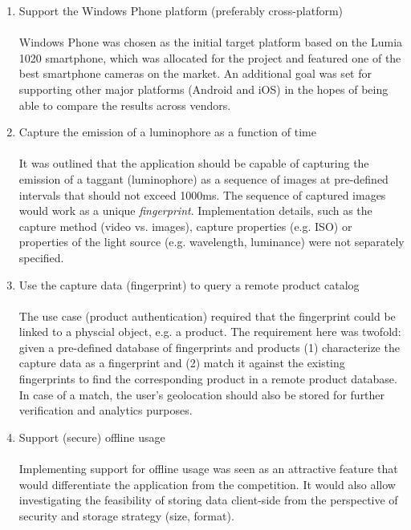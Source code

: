 \documentclass[thesis.tex]{subfiles}
\begin{document}
\begin{enumerate}[leftmargin=0.55in, label=\textbf{R\arabic*}]
	\item \label{R1} Support the Windows Phone platform (preferably cross-platform)\\ \\
	Windows Phone was chosen as the initial target platform based on the Lumia 1020 smartphone, which was allocated for the project and featured one of the best smartphone cameras on the market. An additional goal was set for supporting other major platforms (Android and iOS) in the hopes of being able to compare the results across vendors.

    \item \label{R2} Capture the emission of a luminophore as a function of time\\ \\
    It was outlined that the application should be capable of capturing the emission of a taggant (luminophore) as a sequence of images at pre-defined intervals that should not exceed 1000ms. The sequence of captured images would work as a unique \emph{fingerprint}. Implementation details, such as the capture method (video vs. images), capture properties (e.g. ISO) or properties of the light source (e.g. wavelength, luminance) were not separately specified.

    \item \label{R3} Use the capture data (fingerprint) to query a remote product catalog\\ \\
    The use case (product authentication) required that the fingerprint could be linked to a physcial object, e.g. a product. The requirement here was twofold: given a pre-defined database of fingerprints and products (1) characterize the capture data as a fingerprint and (2) match it against the existing fingerprints to find the corresponding product in a remote product database. In case of a match, the user's geolocation should also be stored for further verification and analytics purposes.

	\item \label{R4} Support (secure) offline usage\\ \\
	Implementing support for offline usage was seen as an attractive feature that would differentiate the application from the competition. It would also allow investigating the feasibility of storing data client-side from the perspective of security and storage strategy (size, format).
\end{enumerate}
\end{document}
